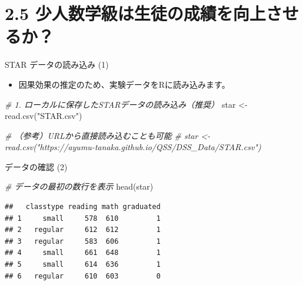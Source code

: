 \documentclass[
  ignorenonframetext,
]{beamer}
\newenvironment{Shaded}{\begin{snugshade}}{\end{snugshade}}
\newcommand{\CommentTok}[1]{\textcolor[rgb]{0.56,0.35,0.01}{\textit{#1}}}
\newcommand{\FunctionTok}[1]{\textcolor[rgb]{0.00,0.00,0.00}{#1}}
\newcommand{\NormalTok}[1]{#1}
\newcommand{\OtherTok}[1]{\textcolor[rgb]{0.56,0.35,0.01}{#1}}
\newcommand{\StringTok}[1]{\textcolor[rgb]{0.31,0.60,0.02}{#1}}
\providecommand{\tightlist}{%
  \setlength{\itemsep}{0pt}\setlength{\parskip}{0pt}}
\begin{document}
\hypertarget{ux5c11ux4ebaux6570ux5b66ux7d1aux306fux751fux5f92ux306eux6210ux7e3eux3092ux5411ux4e0aux3055ux305bux308bux304b}{%
\section{2.5
少人数学級は生徒の成績を向上させるか？}\label{ux5c11ux4ebaux6570ux5b66ux7d1aux306fux751fux5f92ux306eux6210ux7e3eux3092ux5411ux4e0aux3055ux305bux308bux304b}}

\begin{frame}[fragile]{STAR データの読み込み (1)}
\protect\hypertarget{star-ux30c7ux30fcux30bfux306eux8aadux307fux8fbcux307f-1}{}
\begin{itemize}
\tightlist
\item
  因果効果の推定のため、実験データをRに読み込みます。
\end{itemize}

\scriptsize

\begin{Shaded}
\begin{Highlighting}[]
\CommentTok{\# 1. ローカルに保存したSTARデータの読み込み（推奨）}
\NormalTok{star }\OtherTok{\textless{}{-}} \FunctionTok{read.csv}\NormalTok{(}\StringTok{"STAR.csv"}\NormalTok{)}

\CommentTok{\# （参考）URLから直接読み込むことも可能}
\CommentTok{\# star \textless{}{-} read.csv("https://ayumu{-}tanaka.github.io/QSS/DSS\_Data/STAR.csv")}
\end{Highlighting}
\end{Shaded}

\normalsize
\end{frame}

\begin{frame}[fragile]{データの確認 (2)}
\protect\hypertarget{ux30c7ux30fcux30bfux306eux78baux8a8d-2}{}
\scriptsize

\begin{Shaded}
\begin{Highlighting}[]
\CommentTok{\# データの最初の数行を表示}
\FunctionTok{head}\NormalTok{(star)}
\end{Highlighting}
\end{Shaded}

\begin{verbatim}
##   classtype reading math graduated
## 1     small     578  610         1
## 2   regular     612  612         1
## 3   regular     583  606         1
## 4     small     661  648         1
## 5     small     614  636         1
## 6   regular     610  603         0
\end{verbatim}

\normalsize
\end{frame}
\end{document}
